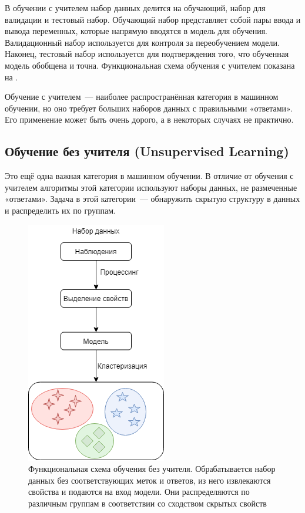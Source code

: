 В обучении с учителем набор данных делится на обучающий, набор для валидации и тестовый набор. Обучающий набор представляет собой пары ввода и вывода переменных, которые напрямую вводятся в модель для обучения. Валидационный набор используется для контроля за переобучением модели. Наконец, тестовый набор используется для подтверждения того, что обученная модель обобщена и точна. Функциональная схема обучения с учителем показана на .

Обучение с учителем~--- наиболее распространённая категория в машинном обучении, но оно требует больших наборов данных с правильными «ответами». Его применение может быть очень дорого, а в некоторых случаях не практично.

\subsection{Обучение без учителя (Unsupervised Learning)}

Это ещё одна важная категория в машинном обучении.
В отличие от обучения с учителем алгоритмы этой категории используют наборы данных, не размеченные «ответами». Задача в этой категории~--- обнаружить скрытую структуру в данных и распределить их по группам.

\begin{figure}[ht!]
    \center
    \includegraphics [scale=0.60] {my_folder/images/ch1/unsupervised-learning.png}
    \caption{Функциональная схема обучения без учителя. Обрабатывается набор данных без соответствующих меток и ответов, из него извлекаются свойства и подаются на вход модели. Они распределяются по различным группам в соответствии со сходством скрытых свойств}
    \label{fig:unsupervised-learning}
\end{figure}

